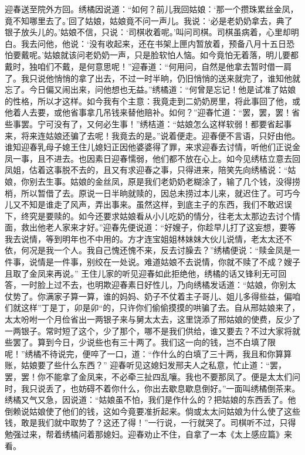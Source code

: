 \documentclass[12pt,oneside]{book}
\begin{document}
迎春送至院外方回。绣橘因说道：“如何？前儿我回姑娘：‘那一个攒珠累丝金凤，竟不知哪里去了。’回了姑娘，姑娘竟不问一声儿。我说：‘必是老奶奶拿去，典了银子放头儿的。’姑娘不信，只说：‘司棋收着呢。’叫问司棋。司棋虽病着，心里却明白。我去问他，他说：‘没有收起来，还在书架上匣内暂放着，预备八月十五日恐怕要戴呢。’姑娘就该问老奶奶一声，只是脸软怕人恼。如今竟怕无着落，明儿要都戴时，独咱们不戴，是何意思呢！”迎春道：“何用问，自然是他拿去暂时借一肩了。我只说他悄悄的拿了出去，不过一时半晌，仍旧悄悄的送来就完了，谁知他就忘了。今日偏又闹出来，问他想也无益。”绣橘道：“何曾是忘记！他是试准了姑娘的性格，所以才这样。如今我有个主意：我竟走到二奶奶房里，将此事回了他，或他着人去要，或他省事拿几吊钱来替他赔补。如何？”迎春忙道：“罢，罢，罢！省些事罢。宁可没有了，又何必生事！”绣桔道：“姑娘怎么这样软弱！都要省起事来，将来连姑娘还骗了去呢！我竟去的是。”说着便走。迎春便不言语，只好由他。
谁知迎春乳母子媳王住儿媳妇正因他婆婆得了罪，来求迎春去讨情，听他们正说金凤一事，且不进去。也因素日迎春懦弱，他们都不放在心上。如今见绣桔立意去回凤姐，估着这事脱不去的，且又有求迎春之事，只得进来，陪笑先向绣橘说：“姑娘，你别去生事。姑娘的金丝凤，原是我们老奶奶老糊涂了，输了几个钱，没得捞梢，所以暂借了去。原说一日半晌就赎的，因总未捞过本儿来，就迟住了。可巧今儿又不知是谁走了风声，弄出事来。虽然这样，到底主子的东西，我们不敢迟误下，终究是要赎的。如今还要求姑娘看从小儿吃奶的情分，往老太太那边去讨个情面，救出他老人家来才好。”迎春先便说道：“好嫂子，你趁早儿打了这妄想，要等我去说情，等到明年也不中用的。方才连宝姐姐林妹妹大伙儿说情，老太太还不依，何况是我一个人。我自己愧还愧不来，反去讨臊去？”绣橘便说：“赎金凤是一件事，说情是一件事，别绞在一处说。难道姑娘不去说情，你就不赎了不成？嫂子且取了金凤来再说。”
王住儿家的听见迎春如此拒绝他，绣橘的话又锋利无可回答，一时脸上过不去，也明欺迎春素日好性儿，乃向绣橘发话道：“姑娘，你别太仗势了。你满家子算一算，谁的妈妈、奶子不仗着主子哥儿、姐儿多得些益，偏咱们就这样”丁是丁，卯是卯“的，只许你们偷偷摸摸的哄骗了去。自从邢姑娘来了，太太吩咐一个月俭省出一两银子来与舅太太去，这里饶添了邢姑娘的使费，反少了一两银子。常时短了这个，少了那个，哪不是我们供给，谁又要去？不过大家将就些罢了。算到今日，少说些也有三十两了。我们这一向的钱，岂不白填了限呢！”绣橘不待说完，便啐了一口，道：“作什么的白填了三十两，我且和你算算账，姑娘要了些什么东西？”
迎春听见这媳妇发邢夫人之私意，忙止道：“罢，罢，罢！你不能拿了金凤来，不必牵三扯四乱嚷。我也不要那凤了。便是太太们问时，我只说丢了，也妨碍不着你什么，你出去歇息歇息倒好。”一面叫绣橘倒茶来。绣橘又气又急，因说道：“姑娘虽不怕，我们是作什么的？把姑娘的东西丢了。他倒赖说姑娘使了他们的钱，这如今竟要准折起来。倘或太太问姑娘为什么使了这些钱，敢是我们就中取势了？这还了得！”一行说，一行就哭了。司棋听不过，只得勉强过来，帮着绣橘问着那媳妇。迎春劝止不住，自拿了一本《太上感应篇》来看。
\end{document}
